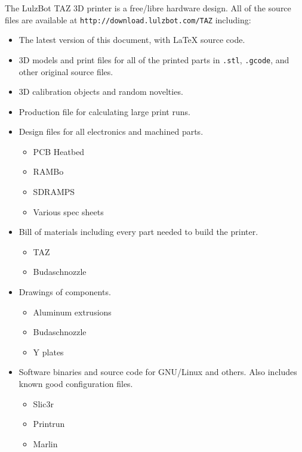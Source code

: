 The LulzBot\textsuperscript{\miniscule{\texttrademark}} TAZ 3D printer is a free/libre hardware design. All of the source files are available at \texttt{http://download.lulzbot.com/TAZ} including:

\begin{itemize}
\item The latest version of this document, with {\LaTeX} source code.

\item 3D models and print files for all of the printed parts in \texttt{.stl}, \texttt{.gcode}, and other original source files.

\item 3D calibration objects and random novelties.

\item Production file for calculating large print runs.

\item Design files for all electronics and machined parts.

\begin{itemize} %
\item PCB Heatbed
\item RAMBo
\item SDRAMPS
\item Various spec sheets
\end{itemize} %

\item Bill of materials including every part needed to build the printer.
\begin{itemize} %
\item TAZ
\item Budaschnozzle
\end{itemize} %

\item Drawings of components.
\begin{itemize} %
\item Aluminum extrusions
\item Budaschnozzle
\item Y plates
\end{itemize} %

\item Software binaries and source code for GNU/Linux and others. Also includes known good configuration files.
\begin{itemize} %
\item Slic3r
\item Printrun
\item Marlin
\end{itemize} %

\end{itemize}


